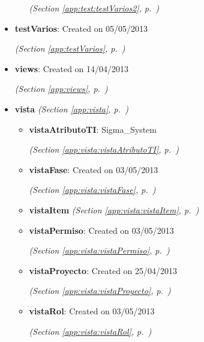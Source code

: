 \begin{itemize}
\begin{itemize}
  \textit{(Section \ref{app:test:testVarios2}, p.~\pageref{app:test:testVarios2})}

  \end{itemize}
\item \textbf{testVarios}: Created on 05/05/2013



  \textit{(Section \ref{app:testVarios}, p.~\pageref{app:testVarios})}

\item \textbf{views}: Created on 14/04/2013



  \textit{(Section \ref{app:views}, p.~\pageref{app:views})}

\item \textbf{vista}
  \textit{(Section \ref{app:vista}, p.~\pageref{app:vista})}

  \begin{itemize}
\setlength{\parskip}{0ex}
    \item \textbf{vistaAtributoTI}: Sigma\_System



  \textit{(Section \ref{app:vista:vistaAtributoTI}, p.~\pageref{app:vista:vistaAtributoTI})}

    \item \textbf{vistaFase}: Created on 03/05/2013



  \textit{(Section \ref{app:vista:vistaFase}, p.~\pageref{app:vista:vistaFase})}

    \item \textbf{vistaItem}
  \textit{(Section \ref{app:vista:vistaItem}, p.~\pageref{app:vista:vistaItem})}

    \item \textbf{vistaPermiso}: Created on 03/05/2013



  \textit{(Section \ref{app:vista:vistaPermiso}, p.~\pageref{app:vista:vistaPermiso})}

    \item \textbf{vistaProyecto}: Created on 25/04/2013



  \textit{(Section \ref{app:vista:vistaProyecto}, p.~\pageref{app:vista:vistaProyecto})}

    \item \textbf{vistaRol}: Created on 03/05/2013



  \textit{(Section \ref{app:vista:vistaRol}, p.~\pageref{app:vista:vistaRol})}


\end{itemize}
\end{itemize}
